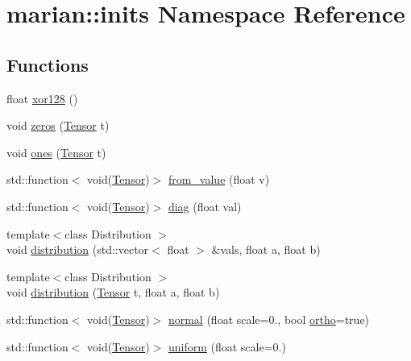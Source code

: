 \hypertarget{namespacemarian_1_1inits}{}\section{marian\+:\+:inits Namespace Reference}
\label{namespacemarian_1_1inits}
\subsection*{Functions}
\begin{DoxyCompactItemize}
\item 
float \hyperlink{namespacemarian_1_1inits_a0b3a55d11c2c9df0b982c3d7ebeb3361}{xor128} ()
\item 
void \hyperlink{namespacemarian_1_1inits_a1bd34fd256e3df7bb1e27955a7f2b359}{zeros} (\hyperlink{namespacemarian_a88b71ec34bb354564cddc24eb80f7e14}{Tensor} t)
\item 
void \hyperlink{namespacemarian_1_1inits_ae2baa2cb7116abb19c235fbe5ed0de9c}{ones} (\hyperlink{namespacemarian_a88b71ec34bb354564cddc24eb80f7e14}{Tensor} t)
\item 
std\+::function$<$ void(\hyperlink{namespacemarian_a88b71ec34bb354564cddc24eb80f7e14}{Tensor})$>$ \hyperlink{namespacemarian_1_1inits_a03723a199ab72a38a13b2b8644e8e1c2}{from\+\_\+value} (float v)
\item 
std\+::function$<$ void(\hyperlink{namespacemarian_a88b71ec34bb354564cddc24eb80f7e14}{Tensor})$>$ \hyperlink{namespacemarian_1_1inits_a41ba9c52b4ff5938b68c85042bbd8fb6}{diag} (float val)
\item 
{\footnotesize template$<$class Distribution $>$ }\\void \hyperlink{namespacemarian_1_1inits_abae13bbee70d5a54e5aff0e07dc51e10}{distribution} (std\+::vector$<$ float $>$ \&vals, float a, float b)
\item 
{\footnotesize template$<$class Distribution $>$ }\\void \hyperlink{namespacemarian_1_1inits_a4d7520676277911627cd1d73ac2380c6}{distribution} (\hyperlink{namespacemarian_a88b71ec34bb354564cddc24eb80f7e14}{Tensor} t, float a, float b)
\item 
std\+::function$<$ void(\hyperlink{namespacemarian_a88b71ec34bb354564cddc24eb80f7e14}{Tensor})$>$ \hyperlink{namespacemarian_1_1inits_ab7e64c6e535adbc8b3ace787a9027de5}{normal} (float scale=0., bool \hyperlink{namespacemarian_1_1inits_a808daef275cdf015fae319efe2a5b6e1}{ortho}=true)
\item 
std\+::function$<$ void(\hyperlink{namespacemarian_a88b71ec34bb354564cddc24eb80f7e14}{Tensor})$>$ \hyperlink{namespacemarian_1_1inits_a835dcbebcc1ee135e5637b2225eaf9d1}{uniform} (float scale=0.)

\end{DoxyCompactItemize}
